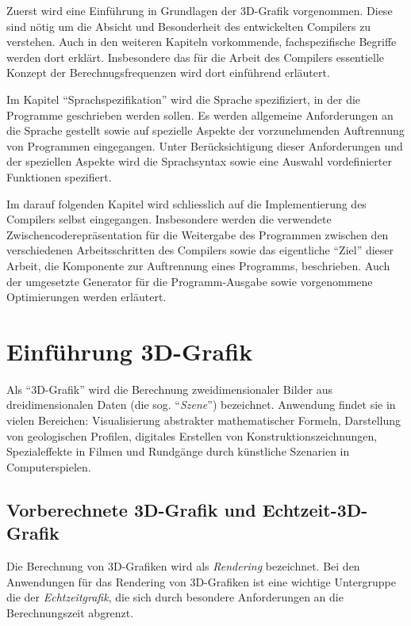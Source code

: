 \documentclass[twoside,a4paper,fleqn,12pt]{book}
\begin{document}
Zuerst wird eine Einführung in Grundlagen der 3D-Grafik vorgenommen. Diese sind nötig um die Absicht und Besonderheit des entwickelten Compilers zu verstehen.
Auch in den weiteren Kapiteln vorkommende, fachspezifische Begriffe werden dort erklärt. Insbesondere das für die Arbeit des Compilers essentielle Konzept
der Berechnugsfrequenzen wird dort einführend erläutert.

Im Kapitel "`Sprachspezifikation"' wird die Sprache spezifiziert, in der die Programme geschrieben werden sollen.
Es werden allgemeine Anforderungen an die Sprache gestellt sowie auf spezielle Aspekte der vorzunehmenden Auftrennung von Programmen eingegangen.
Unter Berücksichtigung dieser Anforderungen und der speziellen Aspekte wird die Sprachsyntax sowie eine Auswahl vordefinierter Funktionen spezifiert.

Im darauf folgenden Kapitel wird schliesslich auf die Implementierung des Compilers selbst eingegangen. Insbesondere werden die verwendete Zwischencoderepräsentation
für die Weitergabe des Programmen zwischen den verschiedenen Arbeitsschritten des Compilers sowie das eigentliche "`Ziel"' dieser Arbeit,
die Komponente zur Auftrennung eines Programms, beschrieben. Auch der umgesetzte Generator für die Programm-Ausgabe sowie vorgenommene Optimierungen
werden erläutert.


\chapter{Einführung 3D-Grafik}

Als "`3D-Grafik"' wird die Berechnung zweidimensionaler Bilder aus dreidimensionalen Daten (die sog. "`\emph{Szene}"')
 bezeichnet.
Anwendung findet sie in vielen Bereichen: Visualisierung abstrakter mathematischer Formeln, Darstellung
von geologischen Profilen, digitales Erstellen von Konstruktionszeichnungen, Spezialeffekte in Filmen und
Rundgänge durch künstliche Szenarien in Computerspielen. 

\section{Vorberechnete 3D-Grafik und Echtzeit-3D-Grafik}

Die Berechnung von 3D-Grafiken wird als \emph{Rendering} bezeichnet. Bei den Anwendungen für das Rendering
von 3D-Grafiken ist eine wichtige Untergruppe die der \emph{Echtzeitgrafik}, die sich durch besondere Anforderungen
an die Berechnungszeit abgrenzt.
\end{document}
